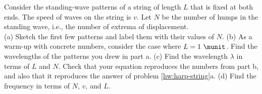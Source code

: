 Consider the standing-wave patterns of a string of length $L$ that is fixed at both ends.
The speed of waves on the string is $v$.
Let $N$ be the number of humps in the standing wave, i.e., the number of extrema
of displacement.\\
(a) Sketch the first few patterns and label them with their values of $N$.\hwendpart
(b) As a warm-up with concrete numbers, consider the case where $L=1\ \munit$.
Find the wavelengths of the patterns you drew in part a.\hwendpart
(c) Find the wavelength $\lambda$ in terms of $L$ and $N$. Check that your
equation reproduces the numbers from part b, and also that it reproduces the
answer of problem \ref{hw:harp-string}a.\hwendpart
(d) Find the frequency in terms of $N$, $v$, and $L$.\answercheck\hwendpart


